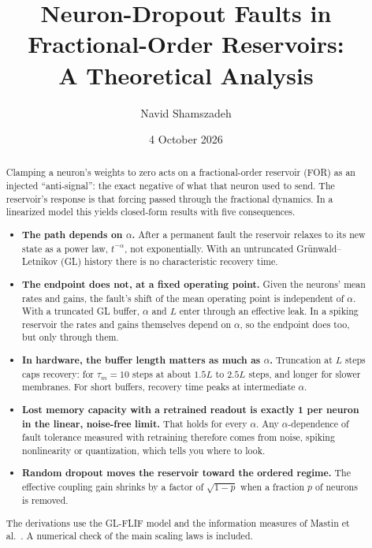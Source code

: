 \documentclass[11pt,a4paper]{article}
\title{Neuron-Dropout Faults in Fractional-Order Reservoirs:\\ A Theoretical Analysis}
\author{Navid Shamszadeh}
\date{4 October 2026}
\begin{document}
\maketitle

\begin{abstract}
\noindent
Clamping a neuron's weights to zero acts on a fractional-order reservoir (FOR) as an injected ``anti-signal'': the exact negative of what that neuron used to send. The reservoir's response is that forcing passed through the fractional dynamics. In a linearized model this yields closed-form results with five consequences.
\begin{itemize}
  \item \textbf{The path depends on $\alpha$.} After a permanent fault the reservoir relaxes to its new state as a power law, $t^{-\alpha}$, not exponentially. With an untruncated Gr\"unwald--Letnikov (GL) history there is no characteristic recovery time.
  \item \textbf{The endpoint does not, at a fixed operating point.} Given the neurons' mean rates and gains, the fault's shift of the mean operating point is independent of $\alpha$. With a truncated GL buffer, $\alpha$ and $L$ enter through an effective leak. In a spiking reservoir the rates and gains themselves depend on $\alpha$, so the endpoint does too, but only through them.
  \item \textbf{In hardware, the buffer length matters as much as $\alpha$.} Truncation at $L$ steps caps recovery: for $\tau_m = 10$ steps at about $1.5L$ to $2.5L$ steps, and longer for slower membranes. For short buffers, recovery time peaks at intermediate $\alpha$.
  \item \textbf{Lost memory capacity with a retrained readout is exactly 1 per neuron in the linear, noise-free limit.} That holds for every $\alpha$. Any $\alpha$-dependence of fault tolerance measured with retraining therefore comes from noise, spiking nonlinearity or quantization, which tells you where to look.
  \item \textbf{Random dropout moves the reservoir toward the ordered regime.} The effective coupling gain shrinks by a factor of $\sqrt{1-p}$ when a fraction $p$ of neurons is removed.
\end{itemize}
The derivations use the GL-FLIF model and the information measures of Mastin et al.~\cite{mastin2026}. A numerical check of the main scaling laws is included.
\end{abstract}

\end{document}
